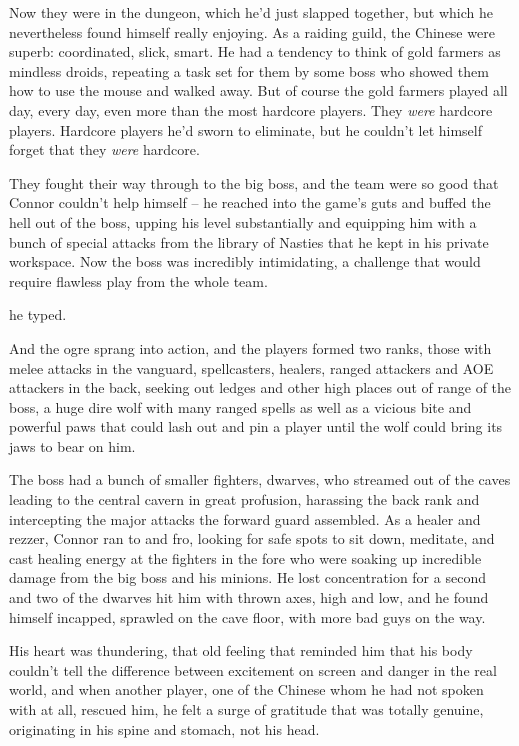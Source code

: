 Now they were in the dungeon, which he'd just slapped together, but
which he nevertheless found himself really enjoying. As a raiding
guild, the Chinese were superb: coordinated, slick, smart. He had a
tendency to think of gold farmers as mindless droids, repeating a
task set for them by some boss who showed them how to use the mouse
and walked away. But of course the gold farmers played all day,
every day, even more than the most hardcore players. They
\emph{were} hardcore players. Hardcore players he'd sworn to
eliminate, but he couldn't let himself forget that they \emph{were}
hardcore.

They fought their way through to the big boss, and the team were so
good that Connor couldn't help himself -- he reached into the
game's guts and buffed the hell out of the boss, upping his level
substantially and equipping him with a bunch of special attacks
from the library of Nasties that he kept in his private workspace.
Now the boss was incredibly intimidating, a challenge that would
require flawless play from the whole team.


he typed.


And the ogre sprang into action, and the players formed two ranks,
those with melee attacks in the vanguard, spellcasters, healers,
ranged attackers and AOE attackers in the back, seeking out ledges
and other high places out of range of the boss, a huge dire wolf
with many ranged spells as well as a vicious bite and powerful paws
that could lash out and pin a player until the wolf could bring its
jaws to bear on him.

The boss had a bunch of smaller fighters, dwarves, who streamed out
of the caves leading to the central cavern in great profusion,
harassing the back rank and intercepting the major attacks the
forward guard assembled. As a healer and rezzer, Connor ran to and
fro, looking for safe spots to sit down, meditate, and cast healing
energy at the fighters in the fore who were soaking up incredible
damage from the big boss and his minions. He lost concentration for
a second and two of the dwarves hit him with thrown axes, high and
low, and he found himself incapped, sprawled on the cave floor,
with more bad guys on the way.

His heart was thundering, that old feeling that reminded him that
his body couldn't tell the difference between excitement on screen
and danger in the real world, and when another player, one of the
Chinese whom he had not spoken with at all, rescued him, he felt a
surge of gratitude that was totally genuine, originating in his
spine and stomach, not his head.

